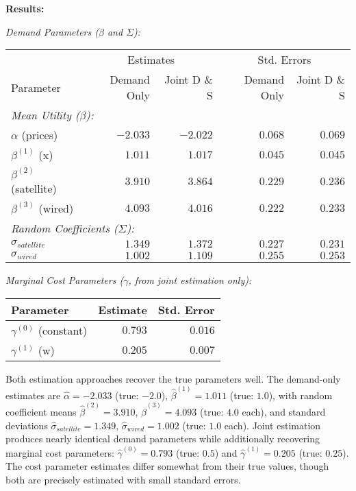 \documentclass[english,11pt]{article}
\begin{document}
\begin{enumerate}
\begin{enumerate}
\textbf{Results:}

\textit{Demand Parameters ($\beta$ and $\Sigma$):}

\begin{center}
\begin{tabular}{lrrrr}
\hline
 & \multicolumn{2}{c}{Estimates} & \multicolumn{2}{c}{Std. Errors} \\
Parameter & Demand Only & Joint D \& S & Demand Only & Joint D \& S \\
\hline
\multicolumn{5}{l}{\textit{Mean Utility ($\beta$):}} \\
$\alpha$ (prices) & $-2.033$ & $-2.022$ & $0.068$ & $0.069$ \\
$\beta^{(1)}$ (x) & $1.011$ & $1.017$ & $0.045$ & $0.045$ \\
$\beta^{(2)}$ (satellite) & $3.910$ & $3.864$ & $0.229$ & $0.236$ \\
$\beta^{(3)}$ (wired) & $4.093$ & $4.016$ & $0.222$ & $0.233$ \\
\hline
\multicolumn{5}{l}{\textit{Random Coefficients ($\Sigma$):}} \\
$\sigma_{satellite}$ & $1.349$ & $1.372$ & $0.227$ & $0.231$ \\
$\sigma_{wired}$ & $1.002$ & $1.109$ & $0.255$ & $0.253$ \\
\hline
\end{tabular}
\end{center}

\textit{Marginal Cost Parameters ($\gamma$, from joint estimation only):}

\begin{center}
\begin{tabular}{lrr}
\hline
Parameter & Estimate & Std. Error \\
\hline
$\gamma^{(0)}$ (constant) & $0.793$ & $0.016$ \\
$\gamma^{(1)}$ (w) & $0.205$ & $0.007$ \\
\hline
\end{tabular}
\end{center}

Both estimation approaches recover the true parameters well. The demand-only estimates are $\hat{\alpha} = -2.033$ (true: $-2.0$), $\hat{\beta}^{(1)} = 1.011$ (true: $1.0$), with random coefficient means $\hat{\beta}^{(2)} = 3.910$, $\hat{\beta}^{(3)} = 4.093$ (true: $4.0$ each), and standard deviations $\hat{\sigma}_{satellite} = 1.349$, $\hat{\sigma}_{wired} = 1.002$ (true: $1.0$ each). Joint estimation produces nearly identical demand parameters while additionally recovering marginal cost parameters: $\hat{\gamma}^{(0)} = 0.793$ (true: $0.5$) and $\hat{\gamma}^{(1)} = 0.205$ (true: $0.25$). The cost parameter estimates differ somewhat from their true values, though both are precisely estimated with small standard errors. 


\end{enumerate}
\end{enumerate}
\end{document}
